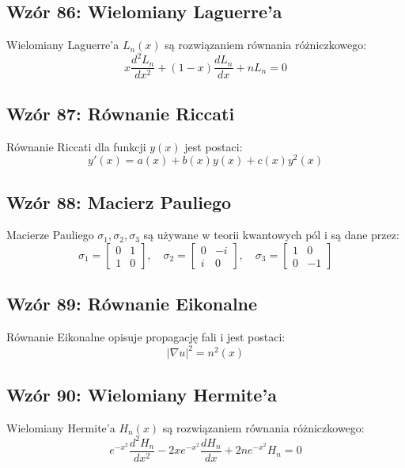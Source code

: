 \documentclass{article}
\begin{document}
\subsection*{Wzór 86: Wielomiany Laguerre'a}

Wielomiany Laguerre'a \(L_n(x)\) są rozwiązaniem równania różniczkowego:
\[ x\frac{d^2L_n}{dx^2} + (1-x)\frac{dL_n}{dx} + nL_n = 0 \]

\subsection*{Wzór 87: Równanie Riccati}

Równanie Riccati dla funkcji \(y(x)\) jest postaci:
\[ y'(x) = a(x) + b(x)y(x) + c(x)y^2(x) \]

\subsection*{Wzór 88: Macierz Pauliego}

Macierze Pauliego \(\sigma_1, \sigma_2, \sigma_3\) są używane w teorii kwantowych pól i są dane przez:
\[ \sigma_1 = \begin{bmatrix} 0 & 1 \\ 1 & 0 \end{bmatrix}, \quad
   \sigma_2 = \begin{bmatrix} 0 & -i \\ i & 0 \end{bmatrix}, \quad
   \sigma_3 = \begin{bmatrix} 1 & 0 \\ 0 & -1 \end{bmatrix} \]

\subsection*{Wzór 89: Równanie Eikonalne}

Równanie Eikonalne opisuje propagację fali i jest postaci:
\[ |\nabla u|^2 = n^2(x) \]

\subsection*{Wzór 90: Wielomiany Hermite'a}

Wielomiany Hermite'a \(H_n(x)\) są rozwiązaniem równania różniczkowego:
\[ e^{-x^2} \frac{d^2H_n}{dx^2} - 2xe^{-x^2} \frac{dH_n}{dx} + 2ne^{-x^2}H_n = 0 \]
\end{document}
